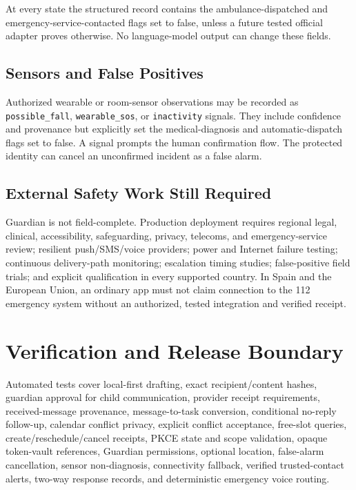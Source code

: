 At every state the structured record contains
the ambulance-dispatched and emergency-service-contacted flags set to false,
unless a future tested official
adapter proves otherwise.  No language-model output can change these fields.

\subsection{Sensors and False Positives}

Authorized wearable or room-sensor observations may be recorded as
\texttt{possible\_fall}, \texttt{wearable\_sos}, or \texttt{inactivity} signals.
They include confidence and provenance but explicitly set
the medical-diagnosis and automatic-dispatch flags set to false.  A
signal prompts the human confirmation flow.  The protected identity can cancel an
unconfirmed incident as a false alarm.

\subsection{External Safety Work Still Required}

Guardian is not field-complete.  Production deployment requires regional legal,
clinical, accessibility, safeguarding, privacy, telecoms, and emergency-service
review; resilient push/SMS/voice providers; power and Internet failure testing;
continuous delivery-path monitoring; escalation timing studies; false-positive
field trials; and explicit qualification in every supported country.  In Spain
and the European Union, an ordinary app must not claim connection to the 112
emergency system without an authorized, tested integration and verified receipt.

\section{Verification and Release Boundary}

Automated tests cover local-first drafting, exact recipient/content hashes,
guardian approval for child communication, provider receipt requirements,
received-message provenance, message-to-task conversion, conditional no-reply
follow-up, calendar conflict privacy, explicit conflict acceptance, free-slot
queries, create/reschedule/cancel receipts, PKCE state and scope validation, opaque
token-vault references, Guardian permissions, optional location, false-alarm
cancellation, sensor non-diagnosis, connectivity fallback, verified trusted-contact
alerts, two-way response records, and deterministic emergency voice routing.

